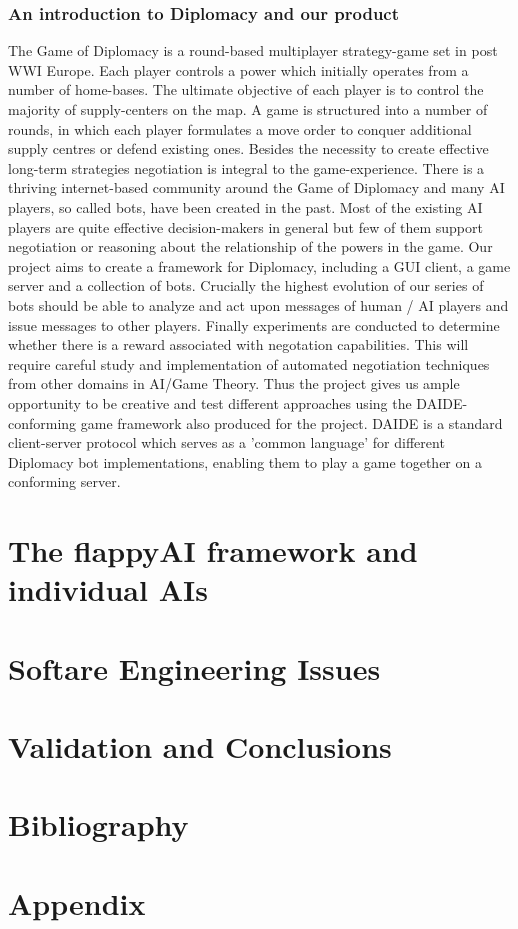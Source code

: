 \documentclass[11pt]{article}
\begin{document}
\subsubsection{An introduction to Diplomacy and our product}
The Game of Diplomacy is a round-based multiplayer strategy-game set in post WWI
Europe. Each player controls a power which initially operates from a number of 
home-bases. The ultimate objective of each player is to control the majority of
supply-centers on the map. A game is structured into a number of rounds, in which
each player formulates a move order to conquer additional supply centres or
defend existing ones. Besides the necessity to create effective long-term
strategies negotiation is integral to the game-experience. There is a thriving
internet-based community around the Game of Diplomacy and many AI players, so
called bots, have been created in the past. Most of the existing AI players are
quite effective decision-makers in general but few of them support negotiation
or reasoning about the relationship of the powers in the game. Our project aims
to create a framework for Diplomacy, including a GUI client, a game server and a
collection of bots. Crucially the highest evolution of our series
of bots should be able to analyze and act upon messages of human / AI players and
issue messages to other players. Finally experiments are conducted to determine whether there is a reward associated with negotation capabilities. This will require careful study and implementation of automated negotiation techniques from other domains in AI/Game Theory. Thus the project gives us ample opportunity to be
creative and test different approaches using the DAIDE-conforming game framework
also produced for the project. DAIDE is a standard client-server protocol which
serves as a 'common language' for different Diplomacy bot implementations, 
enabling them to play a game together on a conforming server.
\section{The flappyAI framework and individual AIs}
\section{Softare Engineering Issues}
\section{Validation and Conclusions}
\section{Bibliography}
\section{Appendix}
\end{document}
